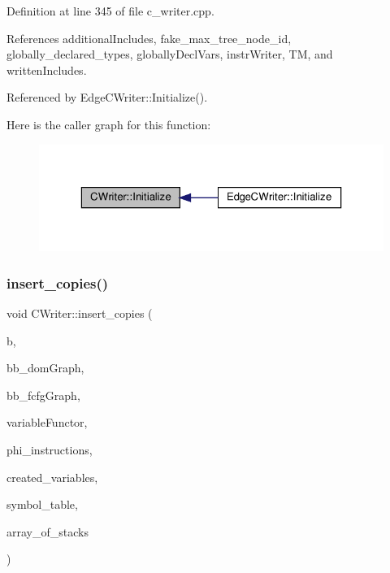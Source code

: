 Definition at line 345 of file c\+\_\+writer.\+cpp.



References additional\+Includes, fake\+\_\+max\+\_\+tree\+\_\+node\+\_\+id, globally\+\_\+declared\+\_\+types, globally\+Decl\+Vars, instr\+Writer, TM, and written\+Includes.



Referenced by Edge\+C\+Writer\+::\+Initialize().

Here is the caller graph for this function\+:
\nopagebreak
\begin{figure}[H]
\begin{center}
\leavevmode
\includegraphics[width=323pt]{d3/d59/classCWriter_a7b57fdc8a06f368a65c03af147834198_icgraph}
\end{center}
\end{figure}
\mbox{\label{classCWriter_ad9cb6bbf514295637f24b12e35af9939}} 
\subsubsection{\texorpdfstring{insert\+\_\+copies()}{insert\_copies()}}
{\footnotesize\ttfamily void C\+Writer\+::insert\+\_\+copies (\begin{DoxyParamCaption}\item[{\hyperlink{graph_8hpp_abefdcf0544e601805af44eca032cca14}{vertex}}]{b,  }\item[{const \hyperlink{basic__block_8hpp_ab66bdbde3a29e41d079d8a320af9c921}{B\+B\+Graph\+Const\+Ref}}]{bb\+\_\+dom\+Graph,  }\item[{const \hyperlink{basic__block_8hpp_ab66bdbde3a29e41d079d8a320af9c921}{B\+B\+Graph\+Const\+Ref}}]{bb\+\_\+fcfg\+Graph,  }\item[{\hyperlink{var__pp__functor_8hpp_a8a6b51b6519401d911398943510557f0}{var\+\_\+pp\+\_\+functor\+Const\+Ref}}]{variable\+Functor,  }\item[{const \hyperlink{custom__set_8hpp_a615bc2f42fc38a4bb1790d12c759e86f}{Custom\+Set}$<$ unsigned int $>$ \&}]{phi\+\_\+instructions,  }\item[{std\+::map$<$ unsigned int, unsigned int $>$ \&}]{created\+\_\+variables,  }\item[{std\+::map$<$ unsigned int, std\+::string $>$ \&}]{symbol\+\_\+table,  }\item[{std\+::map$<$ unsigned int, std\+::deque$<$ std\+::string $>$$>$ \&}]{array\+\_\+of\+\_\+stacks }\end{DoxyParamCaption})\hspace{0.3cm}{\ttfamily [protected]}}



